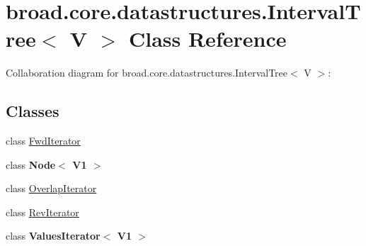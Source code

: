 \hypertarget{classbroad_1_1core_1_1datastructures_1_1_interval_tree_3_01_v_01_4}{\section{broad.\+core.\+datastructures.\+Interval\+Tree$<$ V $>$ Class Reference}
\label{classbroad_1_1core_1_1datastructures_1_1_interval_tree_3_01_v_01_4}
}


Collaboration diagram for broad.\+core.\+datastructures.\+Interval\+Tree$<$ V $>$\+:
\subsection*{Classes}
\begin{DoxyCompactItemize}
\item 
class \hyperlink{classbroad_1_1core_1_1datastructures_1_1_interval_tree_3_01_v_01_4_1_1_fwd_iterator}{Fwd\+Iterator}
\item 
class {\bfseries Node$<$ V1 $>$}
\item 
class \hyperlink{classbroad_1_1core_1_1datastructures_1_1_interval_tree_3_01_v_01_4_1_1_overlap_iterator}{Overlap\+Iterator}
\item 
class \hyperlink{classbroad_1_1core_1_1datastructures_1_1_interval_tree_3_01_v_01_4_1_1_rev_iterator}{Rev\+Iterator}
\item 
class {\bfseries Values\+Iterator$<$ V1 $>$}
\end{DoxyCompactItemize}
